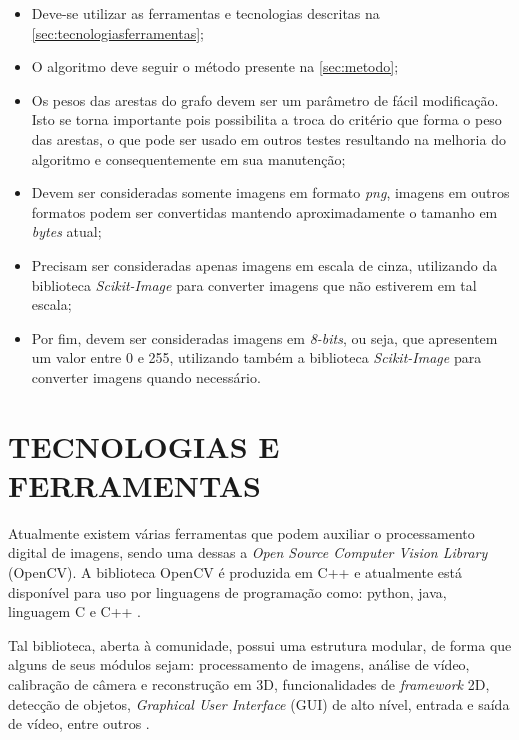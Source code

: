 \begin{itemize}
    \item Deve-se utilizar as ferramentas e tecnologias descritas na  \autoref{sec:tecnologiasferramentas};
    \item O algoritmo deve seguir o método presente na \autoref{sec:metodo};
    \item Os pesos das arestas do grafo devem ser um parâmetro de fácil modificação. Isto se torna importante pois possibilita a troca do critério que forma o peso das arestas, o que pode ser usado em outros testes resultando na melhoria do algoritmo e consequentemente em sua manutenção;
    \item Devem ser consideradas somente imagens em formato \textit{png}, imagens em outros formatos podem ser convertidas mantendo aproximadamente o tamanho em \textit{bytes} atual;
    \item Precisam ser consideradas apenas imagens em escala de cinza, utilizando da biblioteca \textit{Scikit-Image} \cite{ScikitImage} para converter imagens que não estiverem em tal escala;
    \item Por fim, devem ser consideradas imagens em \textit{8-bits}, ou seja, que apresentem um valor entre 0 e 255, utilizando também a biblioteca \textit{Scikit-Image} \cite{ScikitImage} para converter imagens quando necessário.
\end{itemize}

\section{TECNOLOGIAS E FERRAMENTAS}
\label{sec:tecnologiasferramentas}

\par Atualmente existem várias ferramentas que podem auxiliar o processamento digital de imagens, sendo uma dessas a \textit{Open Source Computer Vision Library} (OpenCV).
A biblioteca OpenCV é produzida em C++ e atualmente está disponível para uso por linguagens de programação como: python, java, linguagem C e C++ \cite{opencv_library}.

\par Tal biblioteca, aberta à comunidade, possui uma estrutura modular, de forma que alguns de seus módulos sejam: processamento de imagens, análise de vídeo, calibração de câmera e reconstrução em 3D, funcionalidades de \textit{framework} 2D, detecção de objetos, \textit{Graphical User Interface} (GUI) de alto nível, entrada e saída de vídeo, entre outros \cite{opencv_library}.

